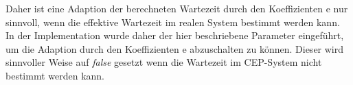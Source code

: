 Daher ist eine Adaption der berechneten Wartezeit durch den Koeffizienten e nur sinnvoll, wenn die effektive Wartezeit im realen System bestimmt werden kann.
In der Implementation wurde daher der hier beschriebene Parameter eingeführt, um die Adaption durch den Koeffizienten e abzuschalten zu können.
Dieser wird sinnvoller Weise auf \textit{false} gesetzt wenn die Wartezeit im CEP-System nicht bestimmt werden kann.

















